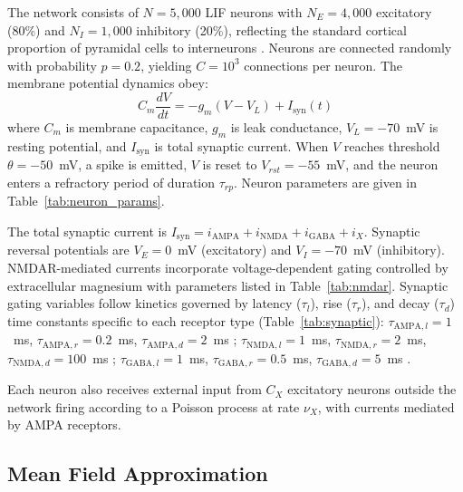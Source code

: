 \documentclass[10pt]{article}
\begin{document}
The network consists of $N = 5{,}000$ LIF neurons with $N_E = 4{,}000$ excitatory (80\%) and $N_I = 1{,}000$ inhibitory (20\%), reflecting the standard cortical proportion of pyramidal cells to interneurons \citep{abeles1991corticonics}. Neurons are connected randomly with probability $p = 0.2$, yielding $C = 10^3$ connections per neuron. The membrane potential dynamics obey:
\begin{equation}
C_m \frac{dV}{dt} = -g_m(V - V_L) + I_{\mathrm{syn}}(t)
\label{eq:lif}
\end{equation}
where $C_m$ is membrane capacitance, $g_m$ is leak conductance, $V_L = -70$~mV is resting potential, and $I_{\mathrm{syn}}$ is total synaptic current. When $V$ reaches threshold $\theta = -50$~mV, a spike is emitted, $V$ is reset to $V_{rst} = -55$~mV, and the neuron enters a refractory period of duration $\tau_{rp}$. Neuron parameters are given in Table~\ref{tab:neuron_params}.

The total synaptic current is $I_{\mathrm{syn}} = i_{\mathrm{AMPA}} + i_{\mathrm{NMDA}} + i_{\mathrm{GABA}} + i_X$. Synaptic reversal potentials are $V_E = 0$~mV (excitatory) and $V_I = -70$~mV (inhibitory). NMDAR-mediated currents incorporate voltage-dependent gating controlled by extracellular magnesium \citep{jahr1990voltage} with parameters listed in Table~\ref{tab:nmdar}. Synaptic gating variables follow kinetics governed by latency ($\tau_l$), rise ($\tau_r$), and decay ($\tau_d$) time constants specific to each receptor type (Table~\ref{tab:synaptic}): $\tau_{\mathrm{AMPA},l} = 1$~ms, $\tau_{\mathrm{AMPA},r} = 0.2$~ms, $\tau_{\mathrm{AMPA},d} = 2$~ms \citep{zhou1998ampa}; $\tau_{\mathrm{NMDA},l} = 1$~ms, $\tau_{\mathrm{NMDA},r} = 2$~ms, $\tau_{\mathrm{NMDA},d} = 100$~ms \citep{hestrin1990analysis}; $\tau_{\mathrm{GABA},l} = 1$~ms, $\tau_{\mathrm{GABA},r} = 0.5$~ms, $\tau_{\mathrm{GABA},d} = 5$~ms \citep{gupta2000organizing}.

Each neuron also receives external input from $C_X$ excitatory neurons outside the network firing according to a Poisson process at rate $\nu_X$, with currents mediated by AMPA receptors.

\subsection{Mean Field Approximation}
\end{document}
